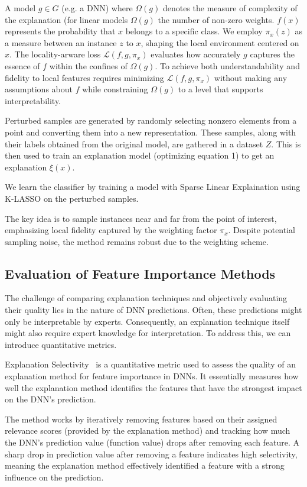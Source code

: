 \documentclass{article}
\begin{document}
A model $g \in G$ (e.g. a DNN) where $\Omega(g)$ denotes the measure of complexity of the explanation (for linear models $\Omega(g)$ the number of non-zero weights. 
$f(x)$ represents the probability that $x$ belongs to a specific class.
We employ $\pi_x(z)$ as a measure between an instance $z$ to $x$, shaping the local environment centered on $x$. 
The locality-arware loss $\mathcal{L}(f, g, \pi_x)$ evaluates how accurately $g$ captures the essence of $f$ within the confines of $\Omega(g)$. 
To achieve both understandability and fidelity to local features requires minimizing $\mathcal{L}(f, g, \pi_x)$ without making any assumptions about $f$ while constraining $\Omega(g)$ to a level that supports interpretability. 

Perturbed samples are generated by randomly selecting nonzero elements from a point and converting them into a new representation. These samples, along with their labels obtained from the original model, are gathered in a dataset $Z$. This is then used to train an explanation model (optimizing equation 1) to get an explanation $\xi(x)$. 

We learn the classifier by training a model with Sparse Linear Explaination using K-LASSO on the perturbed samples.

The key idea is to sample instances near and far from the point of interest, emphasizing local fidelity captured by the weighting factor $\pi_x$. Despite potential sampling noise, the method remains robust due to the weighting scheme. 


\subsection{Evaluation of Feature Importance Methods}
The challenge of comparing explanation techniques and objectively evaluating their quality lies in the nature of DNN predictions. Often, these predictions might only be interpretable by experts. Consequently, an explanation technique itself might also require expert knowledge for interpretation. To address this, we can introduce quantitative metrics.

Explanation Selectivity~\cite{MONTAVON20181} is a quantitative metric used to assess the quality of an explanation method for feature importance in DNNs. It essentially measures how well the explanation method identifies the features that have the strongest impact on the DNN's prediction.

The method works by iteratively removing features based on their assigned relevance scores (provided by the explanation method) and tracking how much the DNN's prediction value (function value) drops after removing each feature. A sharp drop in prediction value after removing a feature indicates high selectivity, meaning the explanation method effectively identified a feature with a strong influence on the prediction.
\end{document}
